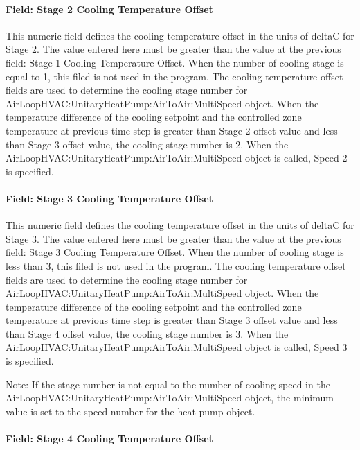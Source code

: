 \paragraph{Field: Stage 2 Cooling Temperature Offset}\label{field-stage-2-cooling-temperature-offset}

This numeric field defines the cooling temperature offset in the units of deltaC for Stage 2. The value entered here must be greater than the value at the previous field: Stage 1 Cooling Temperature Offset. When the number of cooling stage is equal to 1, this filed is not used in the program. The cooling temperature offset fields are used to determine the cooling stage number for AirLoopHVAC:UnitaryHeatPump:AirToAir:MultiSpeed object. When the temperature difference of the cooling setpoint and the controlled zone temperature at previous time step is greater than Stage 2 offset value and less than Stage 3 offset value, the cooling stage number is 2. When the AirLoopHVAC:UnitaryHeatPump:AirToAir:MultiSpeed object is called, Speed 2 is specified.

\paragraph{Field: Stage 3 Cooling Temperature Offset}\label{field-stage-3-cooling-temperature-offset}

This numeric field defines the cooling temperature offset in the units of deltaC for Stage 3. The value entered here must be greater than the value at the previous field: Stage 3 Cooling Temperature Offset. When the number of cooling stage is less than 3, this filed is not used in the program. The cooling temperature offset fields are used to determine the cooling stage number for AirLoopHVAC:UnitaryHeatPump:AirToAir:MultiSpeed object. When the temperature difference of the cooling setpoint and the controlled zone temperature at previous time step is greater than Stage 3 offset value and less than Stage 4 offset value, the cooling stage number is 3. When the AirLoopHVAC:UnitaryHeatPump:AirToAir:MultiSpeed object is called, Speed 3 is specified.

Note: If the stage number is not equal to the number of cooling speed in the AirLoopHVAC:UnitaryHeatPump:AirToAir:MultiSpeed object, the minimum value is set to the speed number for the heat pump object.

\paragraph{Field: Stage 4 Cooling Temperature Offset}\label{field-stage-4-cooling-temperature-offset}

